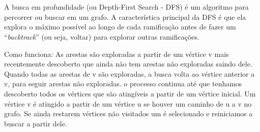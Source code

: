 \documentclass{article}
\newcommand{\quotes}[1]{``#1''}
\begin{document}
\begin{figure}[H]
\begin{subfigure}{\textwidth}
            \caption{}
        \end{subfigure}

    \end{figure}

\section{} %

    A busca em profundidade (ou Depth-First Search - DFS) é um algoritmo para percorrer ou buscar em um grafo. A característica principal da DFS é que ela explora o máximo possível ao longo de cada ramificação antes de fazer um \quotes{\emph{backtrack}} (ou seja, voltar) para explorar outras ramificações.
    
    Como funciona:
    As arestas são exploradas a partir de um vértice v mais recentemente descoberto que ainda não tem arestas não exploradas saindo dele. Quando todas as arestas de v são exploradas, a busca volta ao vértice anterior a v, para seguir arestas não exploradas. o processo continua até que tenhamos descoberto todos os vértices que são atingíveis a partir de um vértice inicial. Um vértice v é atingido a partir de um vértice u se houver um caminho de u a v no grafo. Se ainda restarem vértices não visitados um é selecionado e reiniciamos a buscar a partir dele.\\

    \\
    \\
    \indent{}\\
    \\
    \\
    \indent{}\\
    \indent{}
\end{document}
